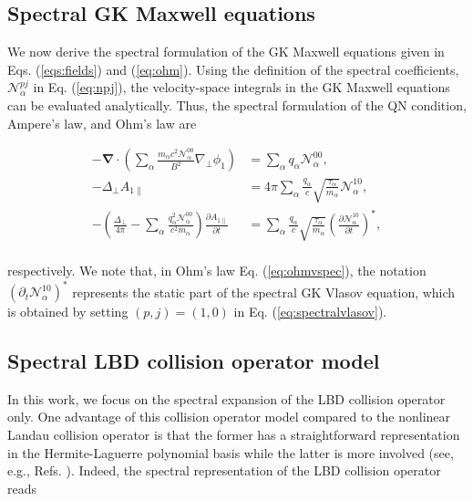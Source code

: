 \documentclass[preprint,12pt]{elsarticle}
\begin{document}
\subsection{Spectral GK Maxwell equations}
\label{subsec:spectralmaxwell}

We now derive the spectral formulation of the GK Maxwell equations given in Eqs. (\ref{eqs:fields}) and (\ref{eq:ohm}). Using the definition of the spectral coefficients, $\mathcal{N}_\alpha^{pj}$ in Eq. (\ref{eq:npj}), the velocity-space integrals in the GK Maxwell equations can be evaluated analytically. Thus, the spectral formulation of the QN condition, Ampere’s law, and Ohm’s law are

\begin{subequations} \label{eq:spectralmaxwells}
  \begin{align}
 -\boldsymbol{\nabla} \cdot\left( \sum_\alpha   \frac{  m_\alpha  c^2 \mathcal{N}_\alpha^{00}}{B^2}   \nabla_{\perp}  \phi_1\right) & =\sum_\alpha   q_\alpha \mathcal{N}_\alpha^{00}   \label{eq:poissonvspec} ,\\
 -  \Delta_{\perp}  A_{1 \|} & =   4 \pi  \sum_\alpha  \frac{q_\alpha}{c}   \sqrt{ \frac{\tau_{\alpha}}{  m_\alpha}}    \mathcal{N}_\alpha^{10}  \label{eq:amperevspec} , \\
   - \left(   \frac{\Delta_{\perp} }{4 \pi} -   \sum_\alpha \frac{q_\alpha^2 \mathcal{N}_\alpha^{00}}{c^2 m_\alpha}   \right)\frac{\partial A_{1 \parallel} }{\partial t}  & =    \sum_\alpha \frac{q_\alpha}{c}   \sqrt{ \frac{\tau_{\alpha}}{  m_\alpha}}  \left( \frac{\partial \mathcal{N}_\alpha^{10}}{\partial t}\right)^* \label{eq:ohmvspec},
 \end{align}
\end{subequations}
\\
respectively. We note that, in Ohm's law Eq. (\ref{eq:ohmvspec}), the notation $(\partial_t \mathcal{N}_\alpha^{10})^*$ represents the static part of the spectral GK Vlasov equation, which is obtained by setting $(p,j) = (1,0)$ in Eq. (\ref{eq:spectralvlasov}).

\subsection{Spectral LBD collision operator model}
\label{subsec:spectrallbd}

In this work, we focus on the spectral expansion of the LBD collision operator only. One advantage of this collision operator model compared to the nonlinear Landau collision operator \cite{landau1936} is that the former has a straightforward representation in the Hermite-Laguerre polynomial basis while the latter is more involved (see, e.g., Refs. \cite{jorge2019,frei2021d}). Indeed, the spectral representation of the LBD collision operator \cite{ulbl2022} reads
\end{document}
